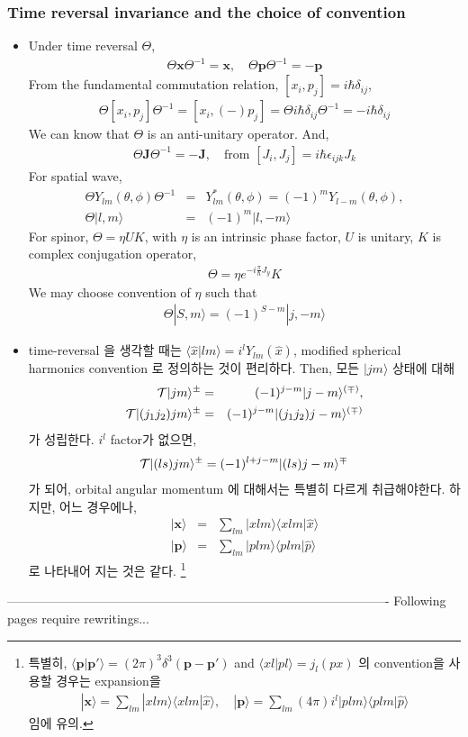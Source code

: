 \documentclass[10pt]{book}
\def\bm{\boldsymbol}
\newcommand{\bea}{\begin{eqnarray}}
\newcommand{\eea}{\end{eqnarray}}
\newcommand{\no}{\nonumber \\}
\def\vp{{\bm p}}
\def\vx{{\bm x}}
\def\la{\langle}
\def\ra{\rangle}
\begin{document}
\subsubsection{Time reversal invariance and the choice of convention}
\begin{itemize} 
\item Under time reversal $\Theta$,
\bea 
\Theta\vx\Theta^{-1}=\vx, \quad \Theta\vp\Theta^{-1}=-\vp 
\eea 
From the fundamental commutation relation, $[x_i,p_j]=i\hbar\delta_{ij}$, 
\bea 
\Theta [x_i,p_j]\Theta^{-1}=[x_i,(-)p_j]
=\Theta i\hbar \delta_{ij} \Theta^{-1}=-i\hbar\delta_{ij}
\eea 
We can know that $\Theta$ is an anti-unitary operator.
And,
\bea 
\Theta {\bm J}\Theta^{-1}=-{\bm J},
\quad \mbox{from } [J_i,J_j]=i\hbar\epsilon_{ijk}J_k
\eea 
For spatial wave,
\bea 
\Theta Y_{lm}(\theta,\phi)\Theta^{-1}
&=&Y_{lm}^*(\theta,\phi)
    =(-1)^m Y_{l-m}(\theta,\phi),\no  
\Theta|l,m\ra &=& (-1)^m|l,-m\ra     
\eea 
For spinor, $\Theta=\eta U K $, with $\eta$ is an intrinsic
phase factor, $U$ is unitary, $K$ is complex conjugation operator,
\bea 
\Theta= \eta e^{-i\frac{\pi}{\hbar} J_y} K
\eea  
We may choose convention of $\eta$ such that
\bea 
\Theta |S,m\ra =(-1)^{S-m}|j,-m\ra 
\eea 

\item time-reversal 을 생각할 때는 
$\la \hat{x}| lm\ra=i^l Y_{lm}(\hat{x})$, modified spherical harmonics convention
로 정의하는 것이 편리하다. 
Then,  모든 $|j m\ra$ 상태에 대해
\bea
{\cal T}|j m\ra^{\pm}&=&(-1)^{j-m}|j -m\ra^{(\mp)},\no
{\cal T}|(j_1 j_2) j m\ra^{\pm}&=&(-1)^{j-m}|(j_1 j_2) j -m\ra^{(\mp)}
\eea
가 성립한다. $i^l$ factor가 없으면, 
\bea
{\cal T}|(l s) j m\ra^{\pm}=
(-1)^{l+j-m}|(l s) j -m\ra^{\mp}
\eea
가 되어, orbital angular momentum 에 대해서는 특별히 다르게 취급해야한다. 하지만,
어느 경우에나,
\bea
|\vx\ra&=&\sum_{lm} |x lm\ra \la x lm|\hat{x}\ra\no
|\vp\ra&=&\sum_{lm} |p lm\ra \la p lm|\hat{p}\ra
\eea
로 나타내어 지는 것은 같다. \footnote{
특별히, $\la \vp|\vp'\ra=(2\pi)^3\delta^{3}(\vp-\vp')$
and $\la x l| p l\ra=j_l(px)$ 의 convention을 사용할 경우는
expansion을
\bea
|\vx\ra=\sum_{lm}|x lm\ra \la x lm|\hat{x}\ra,\quad 
|\vp\ra=\sum_{lm} (4\pi) i^l |p lm\ra \la plm|\hat{p}\ra
\eea
임에 유의.
}
\end{itemize}
-------------------------------------------------------------------------------------------
Following pages require rewritings... 
\end{document}
